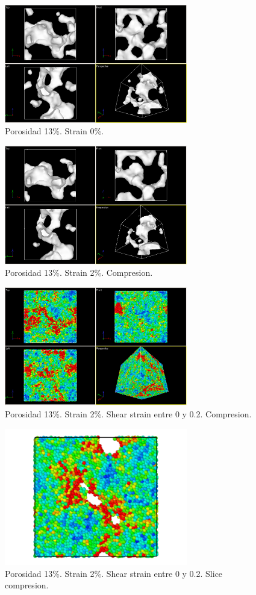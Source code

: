 \documentclass[10pt, oneside]{article} %
\begin{document}
\begin{figure}[H]
\centering
\includegraphics[width=8cm]{Figures/porosidad_13_muestra_0strain.png}
\caption{Porosidad 13\%. Strain 0\%.}
\end{figure}

\begin{figure}[H]
\centering
\includegraphics[width=8cm]{Figures/porosidad_13_muestra_2strain.png}
\caption{Porosidad 13\%. Strain 2\%. Compresion.}
\end{figure}

\begin{figure}[H]
\centering
\includegraphics[width=8cm]{Figures/porosidad_13_muestra_2strain_color_0_02.png}
\caption{Porosidad 13\%. Strain 2\%. Shear strain entre 0 y 0.2. Compresion.}
\end{figure}

\begin{figure}[H]
\centering
\includegraphics[width=8cm]{Figures/porosidad_13_muestra_2strain_color_slice_0_02.png}
\caption{Porosidad 13\%. Strain 2\%. Shear strain entre 0 y 0.2. Slice compresion.}
\end{figure}
\end{document}
